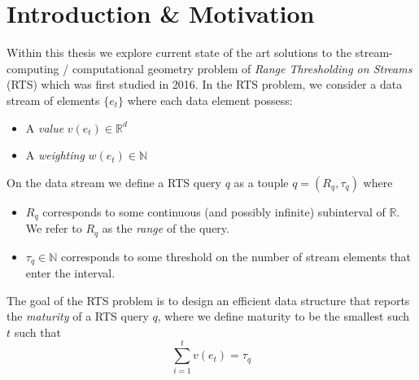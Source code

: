 \section{Introduction \& Motivation}
Within this thesis we explore current state of the art solutions to the stream-computing / computational geometry problem of \textit{Range Thresholding on Streams} (RTS) \cite{Gan} which was first studied in 2016. In the RTS problem, we consider a data stream of elements $\{e_t\}$ where each data element possess: 
\begin{itemize}
    \item A \textit{value} $v(e_t)\in\mathbb{R}^d$
    \item A \textit{weighting} $w(e_t)\in\mathbb{N}$
\end{itemize}
On the data stream we define a RTS query $q$ as a touple $q = (R_q, \tau_q)$ where 
\begin{itemize}
    \item $R_q$ corresponds to some continuous (and possibly infinite) subinterval of $\mathbb{R}$. We refer to $R_q$ as the \textit{range} of the query. 
    \item $\tau_q \in\mathbb{N}$ corresponds to some threshold on the number of stream elements that enter the interval. 
\end{itemize}
The goal of the RTS problem is to design an efficient data structure that reports the \textit{maturity} of a RTS query $q$, where we define maturity to be the smallest such $t$ such that 
$$\sum_{i = 1}^{t} v(e_t) = \tau_q$$
